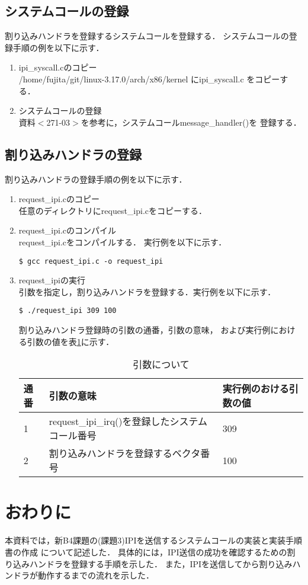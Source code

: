 \documentclass[12pt]{jsarticle}
\begin{document}
\subsection{システムコールの登録}
割り込みハンドラを登録するシステムコールを登録する．
システムコールの登録手順の例を以下に示す．
\begin{enumerate}
    \item ipi\_syscall.cのコピー\\
        /home/fujita/git/linux-3.17.0/arch/x86/kernel にipi\_syscall.c
        をコピーする．
    \item システムコールの登録\\
        資料$<$271-03$>$を参考に，システムコールmessage\_handler()を
        登録する．
        
\end{enumerate}
\subsection{割り込みハンドラの登録}
割り込みハンドラの登録手順の例を以下に示す．
\begin{enumerate}
    \item request\_ipi.cのコピー\\
        任意のディレクトリにrequest\_ipi.cをコピーする．
    \item request\_ipi.cのコンパイル\\
        request\_ipi.cをコンパイルする．
        実行例を以下に示す．
        \begin{verbatim}
$ gcc request_ipi.c -o request_ipi
        \end{verbatim}
    \item request\_ipiの実行\\
        引数を指定し，割り込みハンドラを登録する．実行例を以下に示す．
        \begin{verbatim}
$ ./request_ipi 309 100
        \end{verbatim}
        割り込みハンドラ登録時の引数の通番，引数の意味，
        および実行例における引数の値を表\ref{hikisu}に示す．
        \begin{table}
            \centering
            \begin{tabular}{l|l|l} \hline
                通番&引数の意味                                   &実行例のおける引数の値 \\ \hline
                1   &request\_ipi\_irq()を登録したシステムコール番号&309 \\
                2   &割り込みハンドラを登録するベクタ番号         &100 \\ \hline
            \end{tabular}
            \caption{引数について}
            \label{hikisu}
        \end{table}
\end{enumerate}

\section{おわりに}
本資料では，新B4課題の(課題3)IPIを送信するシステムコールの実装と実装手順書の作成
について記述した．
具体的には，IPI送信の成功を確認するための割り込みハンドラを登録する手順を示した．
また，IPIを送信してから割り込みハンドラが動作するまでの流れを示した．
\end{document}
